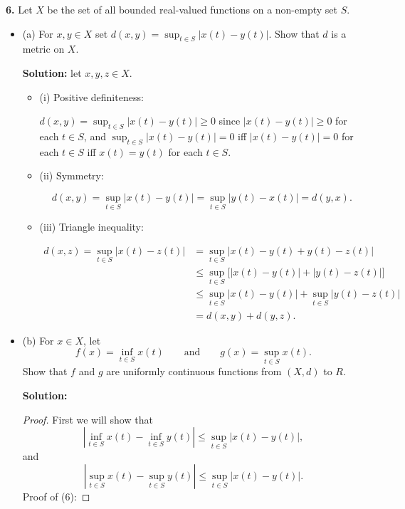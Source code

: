 \documentclass[11pt]{article}
\begin{document}
{\bf 6.} Let $X$ be the set of all bounded real-valued functions on a non-empty
set $S$.
\begin{itemize}[label={},leftmargin=4mm, itemsep=1em, parsep=1em]
  \item (a) For $x,y \in X$ set $d(x,y) = \sup_{t\in S}|x(t) - y(t)|$. Show that
    $d$ is a metric on $X$.

  {\bf Solution:}
  let $x,y,z \in X$.
  \begin{itemize}[label={},leftmargin=4mm, itemsep=1em, parsep=1em]
    \item (i) Positive definiteness:

    $d(x,y) = \sup_{t\in S}|x(t) - y(t)| \geq 0$ since $|x(t) - y(t)| \geq 0$
    for each $t \in S$, and $\sup_{t\in S}|x(t) - y(t)| = 0$ iff $|x(t) - y(t)|
    = 0$ for each $t \in S$ iff $x(t) = y(t)$ for each $t \in S$.

    \item (ii) Symmetry:

    \[ d(x,y) = \sup_{t\in S}|x(t) - y(t)| = \sup_{t\in S}|y(t) - x(t)| =
    d(y,x). \]

    \item (iii) Triangle inequality:

    \begin{align*}
      d(x,z) = \sup_{t\in S}|x(t) - z(t)| & = \sup_{t\in S}|x(t) - y(t) + y(t) -
      z(t)| \\
      & \leq \sup_{t\in S}\bigg[ |x(t) - y(t)| + |y(t) - z(t)| \bigg] \\
      & \leq \sup_{t\in S}|x(t) - y(t)| + \sup_{t\in S}|y(t) - z(t)| \\
      & = d(x,y) + d(y,z).
    \end{align*}
  \end{itemize}
 

  \item (b) For $x \in X$, let 
    \[ f(x) = \inf_{t\in S}x(t) \qquad \text{and} \qquad g(x) = \sup_{t\in
    S}x(t). \]
  Show that $f$ and $g$ are uniformly continuous functions from $(X,d)$ to $R$.

  {\bf Solution:}

  \begin{proof}
    First we will show that 
    \begin{equation}
      |\inf_{t\in S}x(t) - \inf_{t\in S}y(t)| \leq \sup_{t\in S}|x(t) - y(t)|,
    \end{equation}
    and 
    \begin{equation}
      |\sup_{t\in S}x(t) - \sup_{t\in S}y(t)| \leq \sup_{t\in S}|x(t) - y(t)|.
    \end{equation}
    Proof of (6):


\end{proof}
\end{itemize}
\end{document}
